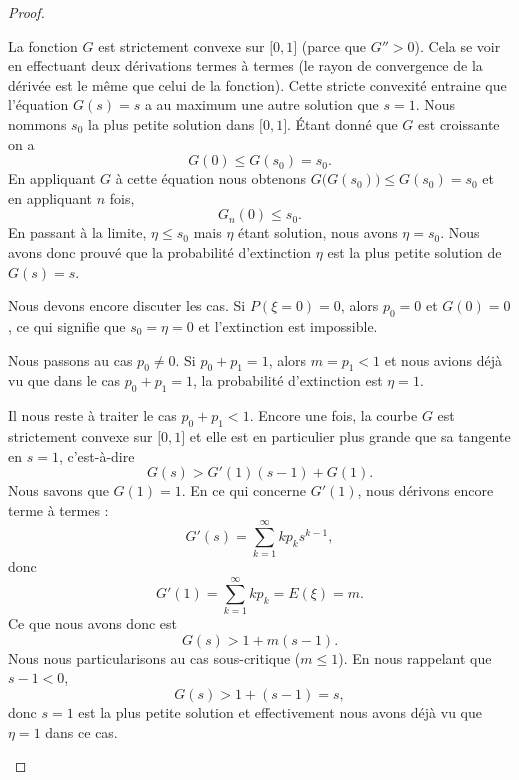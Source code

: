 \begin{proof}
\begin{subproof}
		La fonction \( G\) est strictement convexe sur \( \mathopen[ 0 , 1 \mathclose]\) (parce que \( G''>0\)). Cela se voir en effectuant deux dérivations termes à termes (le rayon de convergence de la dérivée est le même que celui de la fonction). Cette stricte convexité entraine que l'équation \( G(s)=s\) a au maximum une autre solution que \( s=1\). Nous nommons \( s_0\) la plus petite solution dans \( \mathopen[ 0 , 1 \mathclose]\). Étant donné que \( G\) est croissante on a
		\begin{equation}
			G(0)\leq G(s_0)=s_0.
		\end{equation}
		En appliquant \( G\) à cette équation nous obtenons \( G\big( G(s_0) \big)\leq G(s_0)=s_0\) et en appliquant \( n\) fois,
		\begin{equation}
			G_n(0)\leq s_0.
		\end{equation}
		En passant à la limite, \( \eta\leq s_0\) mais \( \eta\) étant solution, nous avons \( \eta=s_0\). Nous avons donc prouvé que la probabilité d'extinction \( \eta\) est la plus petite solution de \( G(s)=s\).


		Nous devons encore discuter les cas. Si \( P(\xi=0)=0\), alors \( p_0=0\) et \( G(0)=0\), ce qui signifie que \( s_0=\eta=0\) et l'extinction est impossible.

		Nous passons au cas \( p_0\neq 0\). Si \( p_0+p_1=1\), alors \( m=p_1<1\) et nous avions déjà vu que dans le cas \( p_0+p_1=1\), la probabilité d'extinction est \( \eta=1\).

		Il nous reste à traiter le cas \( p_0+p_1<1\). Encore une fois, la courbe \( G\) est strictement convexe sur \( \mathopen[ 0 , 1 \mathclose]\) et elle est en particulier plus grande que sa tangente en \( s=1\), c'est-à-dire
		\begin{equation}
			G(s)>G'(1)(s-1)+G(1).
		\end{equation}
		Nous savons que \( G(1)=1\). En ce qui concerne \( G'(1)\), nous dérivons encore terme à termes :
		\begin{equation}
			G'(s)=\sum_{k=1}^{\infty}kp_ks^{k-1},
		\end{equation}
		donc
		\begin{equation}
			G'(1)=\sum_{k=1}^{\infty}kp_k=E(\xi)=m.
		\end{equation}
		Ce que nous avons donc est
		\begin{equation}
			G(s)>1+m(s-1).
		\end{equation}
		Nous nous particularisons au cas sous-critique (\( m\leq 1\)). En nous rappelant que \( s-1<0\),
		\begin{equation}
			G(s)>1+(s-1)=s,
		\end{equation}
		donc \( s=1\) est la plus petite solution et effectivement nous avons déjà vu que \( \eta=1\) dans ce cas.


\end{subproof}
\end{proof}
